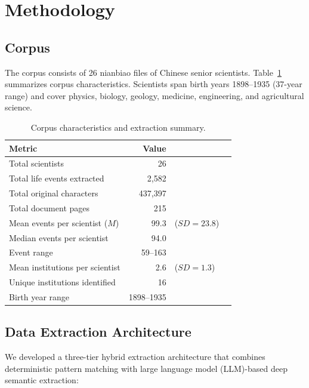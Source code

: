 \documentclass[review]{elsarticle}
\begin{document}
\section{Methodology}
\label{sec:method}

\subsection{Corpus}

The corpus consists of 26 nianbiao files of Chinese senior scientists. Table~\ref{tab:corpus} summarizes corpus characteristics. Scientists span birth years 1898--1935 (37-year range) and cover physics, biology, geology, medicine, engineering, and agricultural science.

\begin{table}[ht]
\centering
\caption{Corpus characteristics and extraction summary.}
\label{tab:corpus}
\begin{tabular}{lrlr}
\toprule
Metric & Value & & \\
\midrule
Total scientists & 26 &  \\
Total life events extracted & 2,582 &  \\
Total original characters & 437,397 &  \\
Total document pages & 215 &  \\
Mean events per scientist ($M$) & 99.3 & ($SD = 23.8$) \\
Median events per scientist & 94.0 &  \\
Event range & 59--163 &  \\
Mean institutions per scientist & 2.6 & ($SD = 1.3$) \\
Unique institutions identified & 16 &  \\
Birth year range & 1898--1935 &  \\
\bottomrule
\end{tabular}
\end{table}

\subsection{Data Extraction Architecture}

We developed a three-tier hybrid extraction architecture that combines deterministic pattern matching with large language model (LLM)-based deep semantic extraction:
\end{document}
